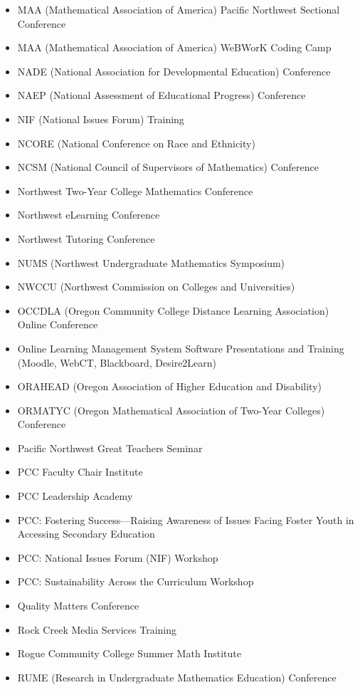 \begin{widepage}
\begin{multicols*}{2}
\begin{itemize}[label={}]
\item MAA (Mathematical Association of America) Pacific Northwest Sectional Conference
\item MAA (Mathematical Association of America) WeBWorK Coding Camp
\item NADE (National Association for Developmental Education) Conference
\item NAEP (National Assessment of Educational Progress) Conference
\item NIF (National Issues Forum) Training
\item NCORE (National Conference on Race and Ethnicity)
\item NCSM (National Council of Supervisors of Mathematics) Conference
\item Northwest Two-Year College Mathematics Conference
\item Northwest eLearning Conference
\item Northwest Tutoring Conference
\item NUMS (Northwest Undergraduate Mathematics Symposium)
\item NWCCU (Northwest Commission on Colleges and Universities)
\item OCCDLA (Oregon Community College Distance Learning Association) Online Conference
\item Online Learning Management System Software Presentations and Training (Moodle, WebCT, Blackboard, Desire2Learn)
\item ORAHEAD (Oregon Association of Higher Education and Disability)
\item ORMATYC (Oregon Mathematical Association of Two-Year Colleges) Conference
\item Pacific Northwest Great Teachers Seminar
\item PCC Faculty Chair Institute
\item PCC Leadership Academy
\item PCC: Fostering Success---Raising Awareness of Issues Facing Foster Youth in Accessing Secondary Education
\item PCC: National Issues Forum (NIF) Workshop
\item PCC: Sustainability Across the Curriculum Workshop %
\item Quality Matters Conference
\item Rock Creek Media Services Training
\item Rogue Community College Summer Math Institute
\item RUME (Research in Undergraduate Mathematics Education) Conference

\end{itemize}
\end{multicols*}
\end{widepage}
